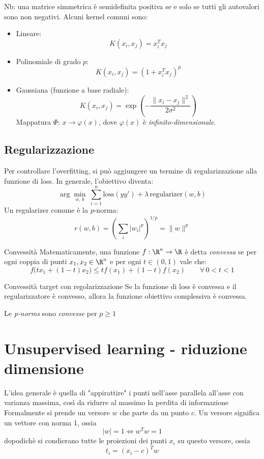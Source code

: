 Nb: una matrice simmetrica è semidefinita positiva se e solo se tutti gli autovalori sono non negativi.
\vskip3mm
Alcuni kernel comuni sono:
\begin{itemize}
	\item Lineare:
	      \[
		      K(x_i, x_j) = x_i^T x_j
	      \]
	\item Polinomiale di grado $p$:
	      \[
		      K(x_i, x_j) = \left( 1 + x_i^T x_j \right)^p
	      \]
	\item Gaussiana (funzione a base radiale):
	      \[
		      K(x_i, x_j) = \exp\left( -\frac{\|x_i - x_j\|^2}{2\sigma^2} \right)
	      \]
	      Mappatura $\Phi$: $x \to \varphi(x)$, dove $\varphi(x)$ è \textit{infinito-dimensionale}.
\end{itemize}

\subsection{Regularizzazione}
Per controllare l'overfitting, si può aggiungere un termine di regularizzazione alla funzione di loss. In generale, l'obiettivo diventa:
\[
	\arg\min_{w,\,b} \; \sum_{i=1}^{n} \text{loss}(y y') + \lambda\, \text{regularizer}(w, b)
\]
Un regularizer comune è la $ p $-norma:
\[
	r\left(w, b\right) = \left( \sum_{i} |w_i|^p \right)^{1/p} = \|w\|^{p}
\]
\begin{definizione}{Convessità}
	Matematicamente, una funzione $ f:\R^n \to \R $ è detta \textit{convessa} se per ogni coppia di punti $ x_1, x_2 \in \R^n $ e per ogni $ t \in (0, 1) $ vale che:
	\[
		f\big(tx_1 + (1-t)x_2\big) \leq t f(x_1) + (1-t) f(x_2) \qquad \forall\, 0 < t < 1
	\]
\end{definizione}
\begin{teorema}{Convessità target con regolarizzazione}
	Se la funzione di loss è convessa e il regularizzatore è convesso, allora la funzione obiettivo complessiva è convessa.
\end{teorema}
Le \textit{p-norms} sono \textit{convesse} per $ p \ge 1 $






\section{Unsupervised learning - riduzione dimensione}
L'idea generale è quella di "appirattire" i punti nell'asse parallela all'asse con varianza massima, così da ridurre al massimo la perdita di informazione
\vskip3mm
Formalmente si prende un versore $ w $ che parte da un punto $ c $. Un versore significa un vettore con norma 1, ossia
\[
	\left|w\right| = 1 \Leftrightarrow w^{T}w = 1
\]
dopodichè si condierano tutte le proiezioni dei punti $ x_i $ su questo versore, ossia
\[
	t_i = \left(x_i - c\right)^{T} w
\]

